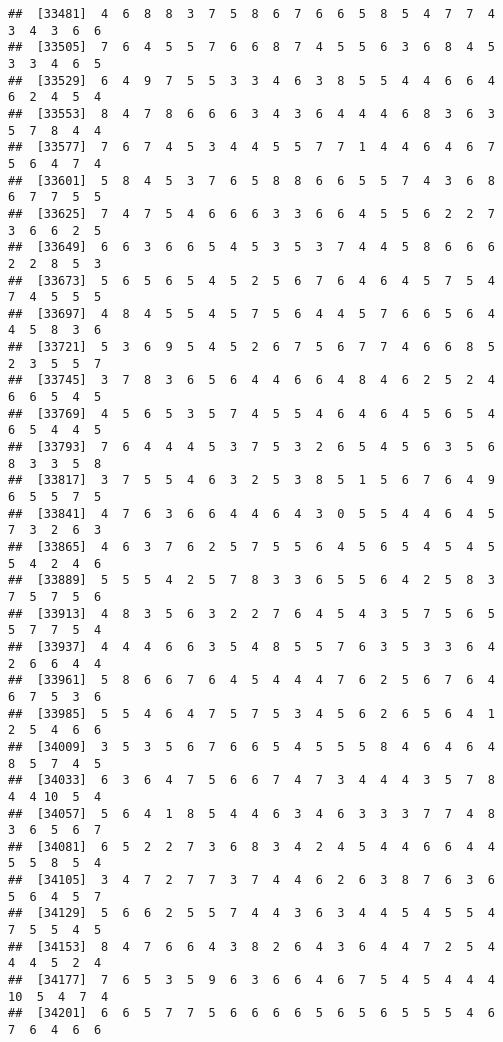 \documentclass[
]{book}
\begin{document}
\begin{verbatim}
##  [33481]  4  6  8  8  3  7  5  8  6  7  6  6  5  8  5  4  7  7  4  3  4  3  6  6
##  [33505]  7  6  4  5  5  7  6  6  8  7  4  5  5  6  3  6  8  4  5  3  3  4  6  5
##  [33529]  6  4  9  7  5  5  3  3  4  6  3  8  5  5  4  4  6  6  4  6  2  4  5  4
##  [33553]  8  4  7  8  6  6  6  3  4  3  6  4  4  4  6  8  3  6  3  5  7  8  4  4
##  [33577]  7  6  7  4  5  3  4  4  5  5  7  7  1  4  4  6  4  6  7  5  6  4  7  4
##  [33601]  5  8  4  5  3  7  6  5  8  8  6  6  5  5  7  4  3  6  8  6  7  7  5  5
##  [33625]  7  4  7  5  4  6  6  6  3  3  6  6  4  5  5  6  2  2  7  3  6  6  2  5
##  [33649]  6  6  3  6  6  5  4  5  3  5  3  7  4  4  5  8  6  6  6  2  2  8  5  3
##  [33673]  5  6  5  6  5  4  5  2  5  6  7  6  4  6  4  5  7  5  4  7  4  5  5  5
##  [33697]  4  8  4  5  5  4  5  7  5  6  4  4  5  7  6  6  5  6  4  4  5  8  3  6
##  [33721]  5  3  6  9  5  4  5  2  6  7  5  6  7  7  4  6  6  8  5  2  3  5  5  7
##  [33745]  3  7  8  3  6  5  6  4  4  6  6  4  8  4  6  2  5  2  4  6  6  5  4  5
##  [33769]  4  5  6  5  3  5  7  4  5  5  4  6  4  6  4  5  6  5  4  6  5  4  4  5
##  [33793]  7  6  4  4  4  5  3  7  5  3  2  6  5  4  5  6  3  5  6  8  3  3  5  8
##  [33817]  3  7  5  5  4  6  3  2  5  3  8  5  1  5  6  7  6  4  9  6  5  5  7  5
##  [33841]  4  7  6  3  6  6  4  4  6  4  3  0  5  5  4  4  6  4  5  7  3  2  6  3
##  [33865]  4  6  3  7  6  2  5  7  5  5  6  4  5  6  5  4  5  4  5  5  4  2  4  6
##  [33889]  5  5  5  4  2  5  7  8  3  3  6  5  5  6  4  2  5  8  3  7  5  7  5  6
##  [33913]  4  8  3  5  6  3  2  2  7  6  4  5  4  3  5  7  5  6  5  5  7  7  5  4
##  [33937]  4  4  4  6  6  3  5  4  8  5  5  7  6  3  5  3  3  6  4  2  6  6  4  4
##  [33961]  5  8  6  6  7  6  4  5  4  4  4  7  6  2  5  6  7  6  4  6  7  5  3  6
##  [33985]  5  5  4  6  4  7  5  7  5  3  4  5  6  2  6  5  6  4  1  2  5  4  6  6
##  [34009]  3  5  3  5  6  7  6  6  5  4  5  5  5  8  4  6  4  6  4  8  5  7  4  5
##  [34033]  6  3  6  4  7  5  6  6  7  4  7  3  4  4  4  3  5  7  8  4  4 10  5  4
##  [34057]  5  6  4  1  8  5  4  4  6  3  4  6  3  3  3  7  7  4  8  3  6  5  6  7
##  [34081]  6  5  2  2  7  3  6  8  3  4  2  4  5  4  4  6  6  4  4  5  5  8  5  4
##  [34105]  3  4  7  2  7  7  3  7  4  4  6  2  6  3  8  7  6  3  6  5  6  4  5  7
##  [34129]  5  6  6  2  5  5  7  4  4  3  6  3  4  4  5  4  5  5  4  7  5  5  4  5
##  [34153]  8  4  7  6  6  4  3  8  2  6  4  3  6  4  4  7  2  5  4  4  4  5  2  4
##  [34177]  7  6  5  3  5  9  6  3  6  6  4  6  7  5  4  5  4  4  4 10  5  4  7  4
##  [34201]  6  6  5  7  7  5  6  6  6  6  5  6  5  6  5  5  5  4  6  7  6  4  6  6

\end{verbatim}
\end{document}

